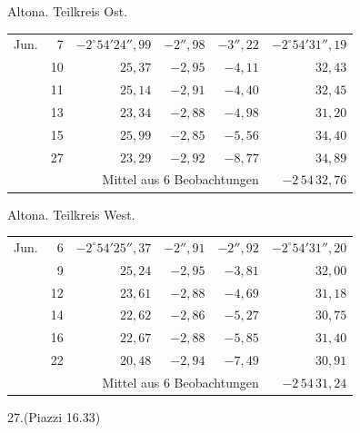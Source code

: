 \noindent\begin{minipage}[t]{.495\textwidth}\centering Altona. Teilkreis Ost.\par\smallskip
{\scriptsize\setlength{\tabcolsep}{1pt}\renewcommand{\arraystretch}{1.2}\begin{tabular}{lr|r|r|r|r|}
Jun.&7&$-2^\circ54'24''{,}99$&$-2''{,}98$&$-3''{,}22$&$-2^\circ54'31''{,}19$\\
&10&$25{,}37$&$-2{,}95$&$-4{,}11$&$32{,}43$\\
&11&$25{,}14$&$-2{,}91$&$-4{,}40$&$32{,}45$\\
&13&$23{,}34$&$-2{,}88$&$-4{,}98$&$31{,}20$\\
&15&$25{,}99$&$-2{,}85$&$-5{,}56$&$34{,}40$\\
&27&$23{,}29$&$-2{,}92$&$-8{,}77$&$34{,}89$\\
\cline{6-6}\multicolumn{5}{r}{Mittel aus 6 Beobachtungen}&$-2\,54\,32{,}76$
\end{tabular}}\end{minipage}\hfill\begin{minipage}[t]{.495\textwidth}\centering Altona. Teilkreis West.\par\smallskip
{\scriptsize\setlength{\tabcolsep}{1pt}\renewcommand{\arraystretch}{1.2}\begin{tabular}{lr|r|r|r|r}
Jun.&6&$-2^\circ54'25''{,}37$&$-2''{,}91$&$-2''{,}92$&$-2^\circ54'31''{,}20$\\
&9&$25{,}24$&$-2{,}95$&$-3{,}81$&$32{,}00$\\
&12&$23{,}61$&$-2{,}88$&$-4{,}69$&$31{,}18$\\
&14&$22{,}62$&$-2{,}86$&$-5{,}27$&$30{,}75$\\
&16&$22{,}67$&$-2{,}88$&$-5{,}85$&$31{,}40$\\
&22&$20{,}48$&$-2{,}94$&$-7{,}49$&$30{,}91$\\
\cline{6-6}\multicolumn{5}{r}{Mittel aus 6 Beobachtungen}&$-2\,54\,31{,}24$
\end{tabular}}\end{minipage}
\par\vspace{4mm}
\begin{center}27.\quad (Piazzi 16.33)\end{center}

